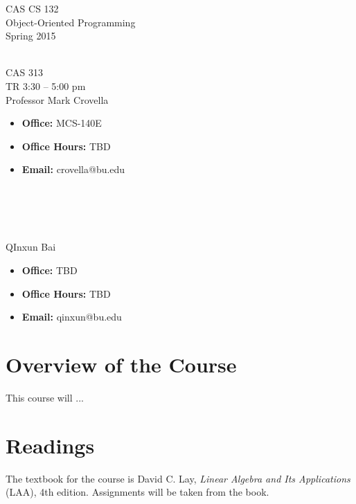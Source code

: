 \documentclass[11pt]{article}
\begin{document}
\begin{center}
\LARGE CAS CS 132\\
\Large Object-Oriented Programming\\
\Large\rm Spring 2015\\~\\
\end{center}

 CAS 313\\[\baselineskip]
 TR 3:30 -- 5:00 pm 
\\[\baselineskip] 

 Professor Mark Crovella\\[0.75\baselineskip]
\begin{minipage}[t]{0.60\textwidth}
\begin{itemize}
\item {\bf Office:} MCS-140E
\item {\bf Office Hours:} {\small TBD}
\item {\bf Email:} crovella@bu.edu
\end{itemize}
\end{minipage}
~\\~\\~\\~\\
  QInxun Bai\\[0.75\baselineskip]
 \begin{minipage}[t]{0.60\textwidth}
 \begin{itemize}
 \item {\bf Office:} TBD
 \item {\bf Office Hours:} {\small TBD}
 \item {\bf Email:} qinxun@bu.edu
 \end{itemize}
 \end{minipage}

\section*{Overview of the Course}

This course will ...

\section*{Readings} 

The textbook for the course is David C. Lay, \emph{Linear Algebra and
  Its Applications} (LAA), 4th edition.    Assignments will be taken
from the book.
\end{document}
